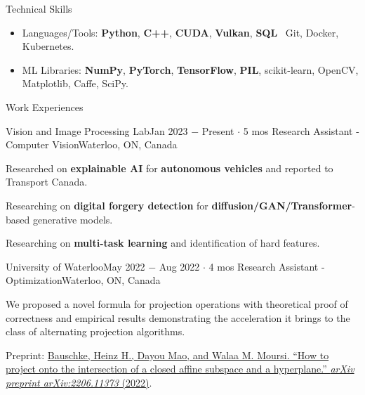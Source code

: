 \documentclass{resume}
\begin{document}
\begin{rSection}{Technical Skills}

    \begin{itemize}
        \item Languages/Tools: \textbf{Python}, \textbf{C++}, \textbf{CUDA}, \textbf{Vulkan}, \textbf{SQL} \textbar\ Git, Docker, Kubernetes.
        \item ML Libraries: \textbf{NumPy}, \textbf{PyTorch}, \textbf{TensorFlow}, \textbf{PIL}, scikit-learn, OpenCV, Matplotlib, Caffe, SciPy.
    \end{itemize}

\end{rSection}

\begin{rSection}{Work Experiences}

    \begin{rSubsection}{Vision and Image Processing Lab}{Jan 2023 \(-\) Present \(\cdot\) 5 mos}
        {Research Assistant - Computer Vision}{Waterloo, ON, Canada}
        \item Researched on \textbf{explainable AI} for \textbf{autonomous vehicles} and reported to Transport Canada.
        \item Researching on \textbf{digital forgery detection} for \textbf{diffusion/GAN/Transformer}-based generative models.
        \item Researching on \textbf{multi-task learning} and identification of hard features.
    \end{rSubsection}

    \begin{rSubsection}{University of Waterloo}{May 2022 \(-\) Aug 2022 \(\cdot\) 4 mos}
        {Research Assistant - Optimization}{Waterloo, ON, Canada}
        \item We proposed a novel formula for projection operations with theoretical proof of correctness and empirical results demonstrating the acceleration it brings to the class of alternating projection algorithms.
        \item Preprint: \href{https://arxiv.org/abs/2206.11373}{Bauschke, Heinz H., Dayou Mao, and Walaa M. Moursi. ``How to project onto the intersection of a closed affine subspace and a hyperplane.'' \textit{arXiv preprint arXiv:2206.11373} (2022)}.
    \end{rSubsection}


\end{rSection}
\end{document}
